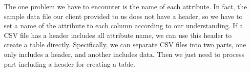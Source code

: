 \noindent The one problem we have to encounter is the name of each attribute. In fact, the sample data file our client provided to us does not have a header, so we have to set a name of the attribute to each column according to our understanding. If a CSV file has a header includes all attribute name, we can use this header to create a table directly. Specifically, we can separate CSV files into two parts, one only includes a header, and another includes data. Then we just need to process part including a header for creating a table. 


